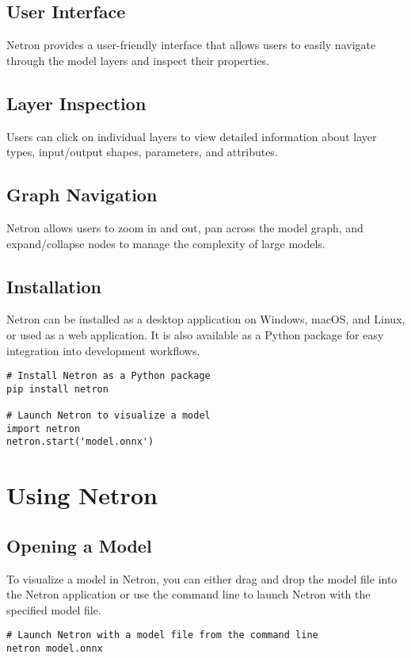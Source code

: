 \subsection{User Interface}
Netron provides a user-friendly interface that allows users to easily navigate through the model layers and inspect their properties.

\subsection{Layer Inspection}
Users can click on individual layers to view detailed information about layer types, input/output shapes, parameters, and attributes.

\subsection{Graph Navigation}
Netron allows users to zoom in and out, pan across the model graph, and expand/collapse nodes to manage the complexity of large models.

\subsection{Installation}
Netron can be installed as a desktop application on Windows, macOS, and Linux, or used as a web application. It is also available as a Python package for easy integration into development workflows.

\begin{verbatim}
# Install Netron as a Python package
pip install netron

# Launch Netron to visualize a model
import netron
netron.start('model.onnx')
\end{verbatim}

\section{Using Netron}

\subsection{Opening a Model}
To visualize a model in Netron, you can either drag and drop the model file into the Netron application or use the command line to launch Netron with the specified model file.

\begin{verbatim}
# Launch Netron with a model file from the command line
netron model.onnx
\end{verbatim}

